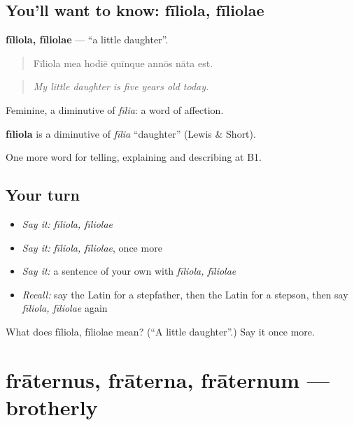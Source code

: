 \subsection*{You'll want to know: fīliola, fīliolae}
\textbf{fīliola, fīliolae} — \textquotedblleft{}a little daughter\textquotedblright{}.

\begin{quote}
Fīliola mea hodiē quīnque annōs nāta est.
\end{quote}

\begin{quote}
\emph{My little daughter is five years old today.}
\end{quote}

Feminine, a diminutive of \emph{fīlia}: a word of affection.

\begin{cousinweb}
\textbf{fīliola} is a diminutive of \emph{fīlia} \textquotedblleft{}daughter\textquotedblright{} (Lewis \& Short).
\end{cousinweb}

\begin{grammarlens}[title={What you've built}]
One more word for telling, explaining and describing at B1.
\end{grammarlens}

\subsection*{Your turn}
\begin{itemize}
\raggedright
  \item \emph{Say it:} \emph{fīliola, fīliolae}
  \item \emph{Say it:} \emph{fīliola, fīliolae}, once more
  \item \emph{Say it:} a sentence of your own with \emph{fīliola, fīliolae}
  \item \emph{Recall:} say the Latin for a stepfather, then the Latin for a stepson, then say \emph{fīliola, fīliolae} again
\end{itemize}

\begin{tcolorbox}[breakable,colback=teal!4,colframe=teal!35!black,title={Before you move on}]
What does fīliola, fīliolae mean? (\textquotedblleft{}A little daughter\textquotedblright{}.) Say it once more.
\end{tcolorbox}
\section[frāternus, frāterna, frāternum]{frāternus, frāterna, frāternum — brotherly}

